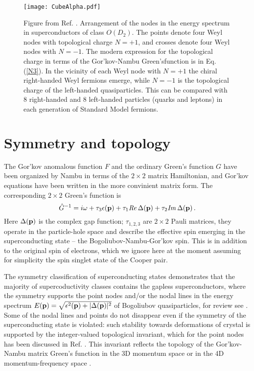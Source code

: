 \documentclass[prb,
superscriptaddress,showpacs,amsmath,amssymb]{revtex4}
\begin{document}
 


\begin{figure}[top]
\centerline{\texttt{[image: CubeAlpha.pdf]}}
\label{Cube} 
  \caption{Figure from Ref. \cite{VolovikGorkov1985}. Arrangement of the nodes in the energy spectrum in superconductors of class $O(D_2)$. The points denote
four Weyl nodes  with topological charge $N=+1$, and crosses denote four Weyl nodes  with $N=-1$. 
The modern expression for the topological charge in terms of the Gor'kov-Nambu Green'sfunction is in Eq.(\ref{N3}).
In the vicinity of each Weyl node with $N=+1$ the chiral right-handed Weyl fermions emerge, while $N=-1$ is the topological charge of the left-handed quasiparticles. This can be compared with 8 right-handed and 8 left-handed particles (quarks and leptons) in each generation of Standard Model fermions.
 }
\end{figure}


\section{Symmetry and topology}
\label{SymmetryTopology}

The Gor'kov anomalous function $F$ and the ordinary Green's function $G$ have been organized by Nambu \cite{Nambu1960} in terms of the $2\times 2$  matrix Hamiltonian, and Gor'kov equations have been written in the more convinient matrix form. 
The corresponding $2\times 2$ Green's function is  
\begin{equation}
  \hat G^{-1}=i\omega +   \tau_3\epsilon({\bf p}) + 
\tau_1{\it Re}\,\Delta({\bf p})  + \tau_2{\it Im}\,\Delta({\bf p}) \,.
 \label{GorkovGreen}
 \end{equation}
Here $\Delta({\bf p})$ is the complex gap function; $\tau_{1,2,3}$ are $2\times 2$ Pauli matrices, they operate in the particle-hole space and describe the effective spin emerging in the superconducting state -- the Bogoliubov-Nambu-Gor'kov spin. This is in addition to the original spin of electrons, which we ignore here at the moment assuming for simplicity the spin singlet state of the Cooper pair.


The symmetry classification of superconducting states \cite{VolovikGorkov1984,VolovikGorkov1985} demonstrates that the majority of supercoductivity classes contains the gapless superconductors, where the symmetry supports the point nodes and/or the nodal lines in the energy spectrum $E({\bf p})= \sqrt{\epsilon^2({\bf p}) +|\Delta({\bf p})|^2}$ of Bogoliubov quasiparticles, for review see \cite{Gorkov1987}. Some of the nodal lines and points do not disappear even if the symmetry of the superconducting state is violated: such stability towards deformations of crystal is supported by the integer-valued topological invariant, which for the point nodes has been discussed in Ref. \cite{VolovikGorkov1985}. This invariant reflects the topology of the Gor'kov-Nambu matrix Green's function
 in the 3D momentum space or in the 4D momentum-frequency space \cite{GrinevichVolovik1988}. 
\end{document}
